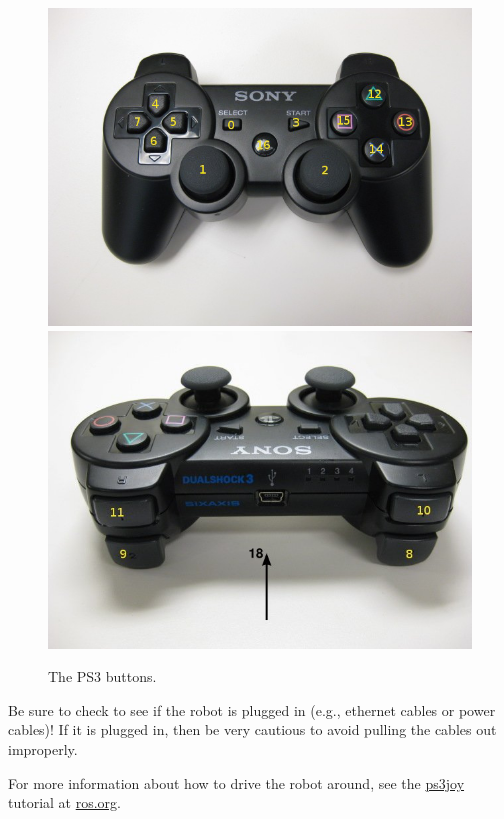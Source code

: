 \begin{figure}[H]
\centering
\includegraphics[scale=0.40]{ps3_buttons.png}
\includegraphics[scale=0.40]{ps3_buttons_front.png}
\caption{The PS3 buttons.}
\label{fig:buttons}
\end{figure}

Be sure to check to see if the robot is plugged in (e.g., ethernet cables or power cables)! If it is plugged in, then be very cautious to avoid pulling the cables out improperly.

For more information about how to drive the robot around, see the 
\href{http://www.ros.org/wiki/ps3joy/Tutorials/UsingJoystickWithPR2}{ps3joy} tutorial at \href{http://www.ros.org}{ros.org}. 

